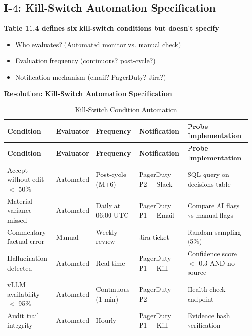 \subsection{I-4: Kill-Switch Automation Specification}
\label{sec:i4-kill-switch}

\begin{tcolorbox}[colback=orange!5,colframe=orange!70,title=\faIcon{exclamation-circle} Finding I-4: Kill-Switch Automation Missing]
\textbf{Table 11.4 defines six kill-switch conditions but doesn't specify:}
\begin{itemize}
    \item Who evaluates? (Automated monitor vs. manual check)
    \item Evaluation frequency (continuous? post-cycle?)
    \item Notification mechanism (email? PagerDuty? Jira?)
\end{itemize}
\end{tcolorbox}

\textbf{Resolution: Kill-Switch Automation Specification}

\begin{longtable}{p{2.5cm} p{2cm} p{2cm} p{3cm} p{3cm}}
\caption{Kill-Switch Condition Automation} \\
\toprule
\textbf{Condition} & \textbf{Evaluator} & \textbf{Frequency} & \textbf{Notification} & \textbf{Probe Implementation} \\
\midrule
\endfirsthead
\toprule
\textbf{Condition} & \textbf{Evaluator} & \textbf{Frequency} & \textbf{Notification} & \textbf{Probe Implementation} \\
\midrule
\endhead
Accept-without-edit $<$ 50\% & Automated & Post-cycle (M+6) & PagerDuty P2 + Slack & SQL query on decisions table \\
Material variance missed & Automated & Daily at 06:00 UTC & PagerDuty P1 + Email & Compare AI flags vs manual flags \\
Commentary factual error & Manual & Weekly review & Jira ticket & Random sampling (5\%) \\
Hallucination detected & Automated & Real-time & PagerDuty P1 + Kill & Confidence score $<$ 0.3 AND no source \\
vLLM availability $<$ 95\% & Automated & Continuous (1-min) & PagerDuty P2 & Health check endpoint \\
Audit trail integrity & Automated & Hourly & PagerDuty P1 + Kill & Evidence hash verification \\
\bottomrule
\end{longtable}

